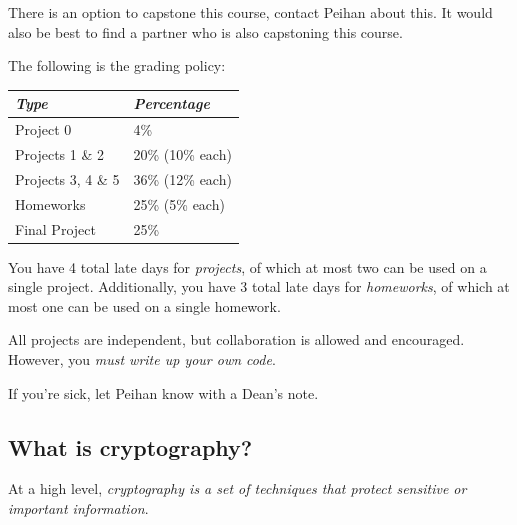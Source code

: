 There is an option to capstone this course, contact Peihan about this. It would also be best to find a partner who is also capstoning this course.

The following is the grading policy:
\begin{center}
    \begin{tabular}{@{}ll@{}}
        \toprule
        \textit{Type}      & \textit{Percentage} \\ \midrule
        Project 0          & 4\%                 \\
        Projects 1 \& 2    & 20\% (10\% each)    \\
        Projects 3, 4 \& 5 & 36\% (12\% each)    \\
        Homeworks          & 25\% (5\% each)     \\
        Final Project      & 25\%                \\ \bottomrule
    \end{tabular}
\end{center}

You have 4 total late days for \emph{projects}, of which at most two can be used on a single project. Additionally, you have 3 total late days for \emph{homeworks}, of which at most one can be used on a single homework.

All projects are independent, but collaboration is allowed and encouraged. However, you \emph{must write up your own code}.

If you're sick, let Peihan know with a Dean's note.

\subsection{What is cryptography?}

At a high level, \emph{cryptography is a set of techniques that protect sensitive or important information}.

